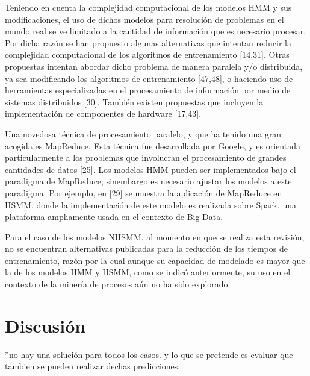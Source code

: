 Teniendo en cuenta la complejidad computacional de los modelos HMM y sus modificaciones, el uso de dichos modelos para resolución de problemas en el mundo real se ve limitado a la cantidad de información que es necesario procesar. Por dicha razón se han propuesto algunas alternativas que intentan reducir la complejidad computacional de los algoritmos de entrenamiento [14,31]. Otras propuestas intentan abordar dicho problema de manera paralela y/o distribuida, ya sea modificando los algoritmos de entrenamiento [47,48], o haciendo uso de herramientas especializadas en el procesamiento de información por medio de sistemas distribuidos [30]. También existen propuestas que incluyen la implementación de componentes de hardware [17,43].

Una novedosa técnica de procesamiento paralelo, y que ha tenido una gran acogida es MapReduce. Esta técnica fue desarrollada por Google, y es orientada particularmente a los problemas que involucran el procesamiento de grandes cantidades de datos [25]. Los modelos HMM pueden ser implementados bajo el paradigma de MapReduce, sinembargo es necesario ajustar los modelos a este paradigma. Por ejemplo, en [29] se muestra la aplicación de MapReduce en HSMM, donde la implementación de este modelo es realizada sobre Spark, una plataforma ampliamente usada en el contexto de Big Data.

Para el caso de los modelos NHSMM, al momento en que se realiza esta revisión, no se encuentran alternativas publicadas para la reducción de los tiempos de entrenamiento, razón por la cual aunque su capacidad de modelado es mayor que la de los modelos HMM y HSMM, como se indicó anteriormente, su uso en el contexto de la minería de procesos aún no ha sido explorado.

\section{Discusión} %
\label{section1.4}

*no hay una solución para todos los casos. y lo que se pretende es evaluar que tambien se pueden realizar dechas predicciones.

